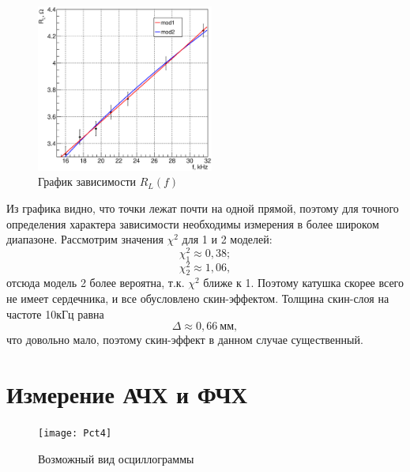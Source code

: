 \documentclass[12pt,a4paper]{article}
\begin{document}
\begin{figure}
\centering\includegraphics[width = 0.52\textwidth]{Plt1}
\captionsetup{justification = centering}
\caption{График зависимости $R_L(f)$\label{Fig3}}
\end{figure}

Из графика видно, что точки лежат почти на одной прямой, поэтому для точного определения характера зависимости необходимы измерения в более широком диапазоне. Рассмотрим значения $\chi^2$ для 1 и 2 моделей:
\begin{equation}
\chi_1^2\approx0,38;
\end{equation}
\begin{equation}
\chi_2^2\approx1,06,
\end{equation}
отсюда модель 2 более вероятна, т.к. $\chi^2$ ближе к 1. Поэтому катушка скорее всего не имеет сердечника, и все обусловлено скин-эффектом. Толщина скин-слоя на частоте 10кГц равна
\begin{equation}
\Delta \approx 0,66~\text{мм},
\end{equation}
что довольно мало, поэтому скин-эффект в данном случае существенный.
\section{Измерение АЧХ и ФЧХ}
\begin{figure}
\centering\texttt{[image: Pct4]}
\captionsetup{justification = centering}
\caption{Возможный вид осциллограммы\label{Fig4}}
\end{figure}
\end{document}
